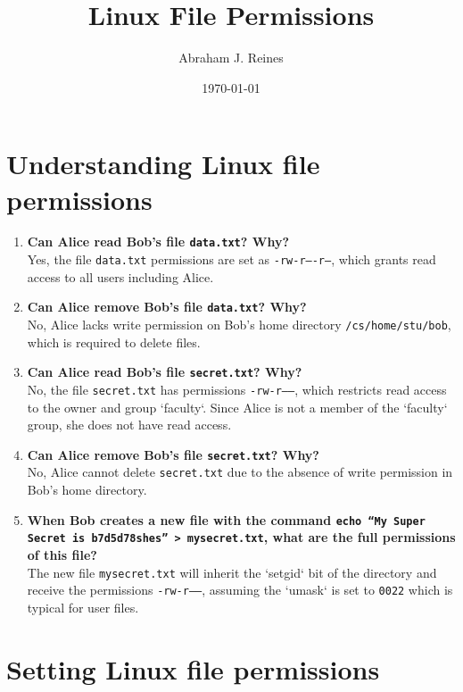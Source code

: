 \documentclass{article}
\title{Linux File Permissions}
\author{Abraham J. Reines}
\date{\today}
\begin{document}
\maketitle

\section*{Understanding Linux file permissions}

\begin{enumerate}
    \item \textbf{Can Alice read Bob's file \texttt{data.txt}? Why?}\\
    Yes, the file \texttt{data.txt} permissions are set as \texttt{-rw-r----r--}, which grants read access to all users including Alice.
    
    \item \textbf{Can Alice remove Bob's file \texttt{data.txt}? Why?}\\
    No, Alice lacks write permission on Bob's home directory \texttt{/cs/home/stu/bob}, which is required to delete files.
    
    \item \textbf{Can Alice read Bob's file \texttt{secret.txt}? Why?}\\
    No, the file \texttt{secret.txt} has permissions \texttt{-rw-r-----}, which restricts read access to the owner and group `faculty`. Since Alice is not a member of the `faculty` group, she does not have read access.
    
    \item \textbf{Can Alice remove Bob's file \texttt{secret.txt}? Why?}\\
    No, Alice cannot delete \texttt{secret.txt} due to the absence of write permission in Bob's home directory.
    
    \item \textbf{When Bob creates a new file with the command \texttt{echo “My Super Secret is b7d5d78shes” > mysecret.txt}, what are the full permissions of this file?}\\
    The new file \texttt{mysecret.txt} will inherit the `setgid` bit of the directory and receive the permissions \texttt{-rw-r-----}, assuming the `umask` is set to \texttt{0022} which is typical for user files.
\end{enumerate}

\section*{Setting Linux file permissions}
\end{document}
